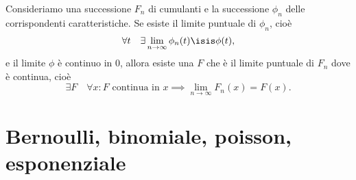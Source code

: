 \begin{fact}
	\label{th:paullevy}
	Consideriamo una successione $F_n$ di cumulanti e la successione $\phi_n$ delle corrispondenti caratteristiche.
	Se esiste il limite puntuale di $\phi_n$, cioè
	\begin{equation*}
		\forall t \quad \exists \lim_{n\to\infty} \phi_n(t) \isis \phi(t),
	\end{equation*}
	e il limite $\phi$ è continuo in 0, allora
	esiste una $F$ che è il limite puntuale di $F_n$ dove è continua, cioè
	\begin{equation*}
		\exists F \quad \forall x: \text{$F$ continua in $x$} \implies
		\lim_{n\to\infty} F_n(x) = F(x).
	\end{equation*}
\end{fact}

\section{Bernoulli, binomiale, poisson, esponenziale}


